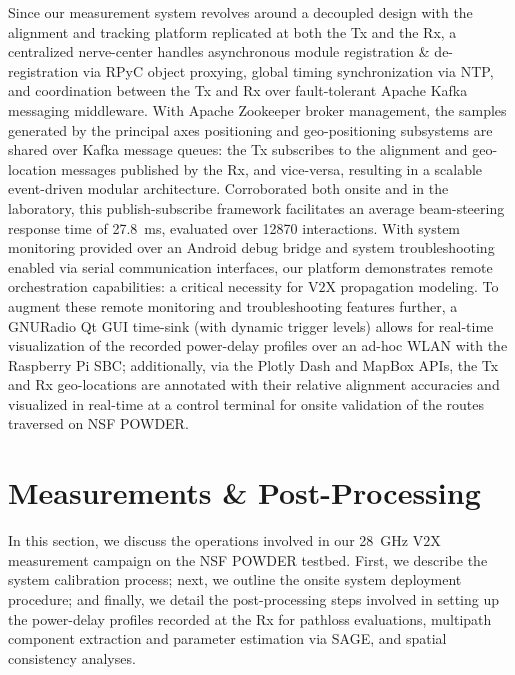 \documentclass[12pt, draftcls, onecolumn]{IEEEtran}
\begin{document}
Since our measurement system revolves around a decoupled design with the alignment and tracking platform replicated at both the Tx and the Rx, a centralized nerve-center handles asynchronous module registration \& de-registration via RPyC object proxying, global timing synchronization via NTP, and coordination between the Tx and Rx over fault-tolerant Apache Kafka messaging middleware. With Apache Zookeeper broker management, the samples generated by the principal axes positioning and geo-positioning subsystems are shared over Kafka message queues: the Tx subscribes to the alignment and geo-location messages published by the Rx, and vice-versa, resulting in a scalable event-driven modular architecture. Corroborated both onsite and in the laboratory, this publish-subscribe framework facilitates an average beam-steering response time of \SI{27.8}{\milli\second}, evaluated over \SI{12870}{} interactions. With system monitoring provided over an Android debug bridge and system troubleshooting enabled via serial communication interfaces, our platform demonstrates remote orchestration capabilities: a critical necessity for V$2$X propagation modeling. To augment these remote monitoring and troubleshooting features further, a GNURadio Qt GUI time-sink (with dynamic trigger levels) allows for real-time visualization of the recorded power-delay profiles over an ad-hoc WLAN with the Raspberry Pi SBC; additionally, via the Plotly Dash and MapBox APIs, the Tx and Rx geo-locations are annotated with their relative alignment accuracies and visualized in real-time at a control terminal for onsite validation of the routes traversed on NSF POWDER.
\vspace{-4mm}

\section{Measurements \& Post-Processing}\label{S3}
In this section, we discuss the operations involved in our \SI{28}{\giga\hertz} V$2$X measurement campaign on the NSF POWDER testbed. First, we describe the system calibration process; next, we outline the onsite system deployment procedure; and finally, we detail the post-processing steps involved in setting up the power-delay profiles recorded at the Rx for pathloss evaluations, multipath component extraction and parameter estimation via SAGE, and spatial consistency analyses.
\end{document}
